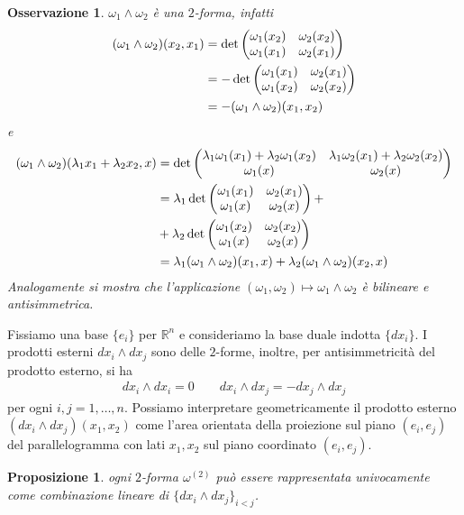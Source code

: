 \documentclass[oneside, 11pt]{amsbook}
\newcommand{\0}{{(0)}}
\newcommand{\3}{{(3)}}
\theoremstyle{colonplain}
\newtheorem{prop}[thm]{Proposizione}
\theoremstyle{colondefinition}
\theoremstyle{colonremark}
\newtheorem{rmk}[thm]{Osservazione}
\numberwithin{equation}{chapter}
\begin{document}
\begin{rmk} $\omega_1 \wedge \omega_2$ è una $2$-forma, infatti
\begin{align}
    (\omega_1 \wedge \omega_2)(x_2, x_1) &= \det
    \begin{pmatrix}
        \omega_1(x_2) & \omega_2(x_2) \\
        \omega_1(x_1) & \omega_2(x_1)
    \end{pmatrix}
    \notag \\
    &= -\det
    \begin{pmatrix}
        \omega_1(x_1) & \omega_2(x_1) \\
        \omega_1(x_2) & \omega_2(x_2)
    \end{pmatrix}
    \notag \\
    &= -(\omega_1 \wedge \omega_2)(x_1, x_2) 
\end{align}
e
\begin{align}
    (\omega_1 \wedge \omega_2)(\lambda_1x_1 + \lambda_2x_2, x) &= \det
    \begin{pmatrix}
        \lambda_1\omega_1(x_1) + \lambda_2\omega_1(x_2) & \lambda_1\omega_2(x_1) + \lambda_2\omega_2(x_2) \\
        \omega_1(x) & \omega_2(x)
    \end{pmatrix}
    \notag \\
    &= \lambda_1\det
    \begin{pmatrix}
        \omega_1(x_1) & \omega_2(x_1) \\
        \omega_1(x) & \omega_2(x)
    \end{pmatrix}
    + \notag \\
    &+ \lambda_2\det
    \begin{pmatrix}
        \omega_1(x_2) & \omega_2(x_2) \\
        \omega_1(x) & \omega_2(x)
    \end{pmatrix}
    \notag \\
    &= \lambda_1(\omega_1 \wedge \omega_2)(x_1, x) + \lambda_2(\omega_1 \wedge \omega_2)(x_2, x) 
\end{align}
Analogamente si mostra che l'applicazione $(\omega_1, \omega_2) \mapsto \omega_1 \wedge \omega_2$ è bilineare e antisimmetrica.
\end{rmk}
Fissiamo una base $\{e_i\}$ per $\mathbb{R}^n$ e consideriamo la base duale indotta $\{dx_i\}$. I prodotti esterni $dx_i \wedge dx_j$ sono delle $2$-forme, inoltre, per antisimmetricità del prodotto esterno, si ha 
\begin{align}
    dx_i \wedge dx_i = 0 \qquad dx_i \wedge dx_j = -dx_j \wedge dx_j 
\end{align}
per ogni $i, j = 1, \dots, n$. Possiamo interpretare geometricamente il prodotto esterno $(dx_i \wedge dx_j)(x_1, x_2)$ come l'area orientata della proiezione sul piano $(e_i, e_j)$ del parallelogramma con lati $x_1, x_2$ sul piano coordinato $(e_i, e_j)$.
\begin{prop} ogni $2$-forma $\omega^{(2)}$ può essere rappresentata univocamente come combinazione lineare di $\{dx_i \wedge dx_j\}_{i < j}$.
\end{prop}
\end{document}
